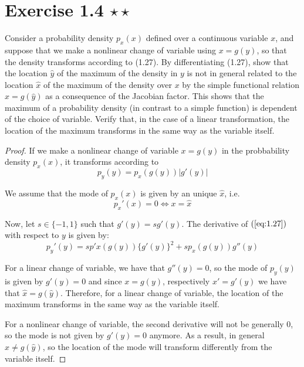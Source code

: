 \section*{Exercise 1.4 $\star \star$}
Consider a probability density $p_x(x)$ defined over a continuous variable
$x$, and suppose that we make a nonlinear change of variable using $x = g(y)$,
so that the density transforms according to (1.27). By differentiating (1.27),
show that the location  $\widehat{y}$ of the maximum of the density in
$y$ is not in general related to the location $\widehat{x}$ of the maximum of the
density over $x$ by the simple functional relation $\widehat{x} = g(\widehat{y})$ 
as a consequence of the Jacobian factor. This shows that the maximum of a probability
density (in contrast to a simple function) is dependent of the choice of variable.
Verify that, in the case of a linear transformation, the location of the maximum
transforms in the same way as the variable itself.

\vspace{1em}

\begin{proof}
    If we make a nonlinear change of variable $x = g(y)$ in the probbability density 
    $p_x(x)$, it transforms according to
    \begin{equation}\label{eq:1.27}\tag{1.27}
        p_y(y) = p_x(g(y)) |g'(y)|
    \end{equation}

    We assume that the mode of $p_x(x)$ is given by an unique $\widehat{x}$, i.e.
     \[
         p_x'(x) = 0 \iff x = \widehat{x}
    \] 

    Now, let $s \in \{-1, 1\}$ such that $g'(y) = sg'(y)$. 
    The derivative of  $(\ref{eq:1.27})$ with respect to $y$ is given by:
    \[
        p_y'(y) = sp'x(g(y))\{g'(y)\}^2 + sp_x(g(y))g''(y)
    \] 

    For a linear change of variable, we have that $g''(y) = 0$, so the mode of $p_y(y)$ 
    is given by $g'(y) = 0$ and since $x = g(y)$, respectively $x' = g'(y)$ we have that
    $\widehat{x} = g(\widehat{y})$. Therefore, for a linear change of variable, the location
    of the maximum transforms in the same way as the variable itself.

    For a nonlinear change of variable, the second derivative will not be generally 0, so
    the mode is not given by $g'(y) = 0$ anymore. As a result, in general $\widehat{x} \neq g(\widehat{y})$,
    so the location of the mode will transform differently from the variable itself.
\end{proof}

